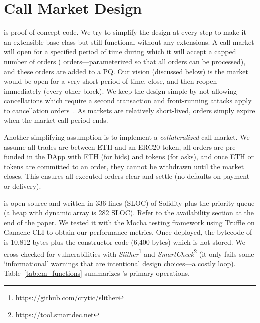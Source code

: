 
\section{Call Market Design}



\cm is proof of concept code. We try to simplify the design at every step to make it an extensible base class but still functional without any extensions. A call market will open for a specified period of time during which it will accept a capped number of orders ( orders---parameterized so that all orders can be processed), and these orders are added to a PQ. Our vision (discussed below) is the market would be open for a very short period of time, close, and then reopen immediately (\eg every other block). We keep the design simple by not allowing cancellations which require a second transaction and front-running attacks apply to cancellation orders~\cite{eskandari2019sok}. As markets are relatively short-lived, orders simply expire when the market call period ends.

Another simplifying assumption is to implement a \textit{collateralized} call market. We assume all trades are between ETH and an ERC20 token, all orders are pre-funded in the DApp with ETH (for bids) and tokens (for asks), and once ETH or tokens are committed to an order, they cannot be withdrawn until the market closes. This ensures all executed orders clear and settle (\ie no defaults on payment or delivery).


\cm is open source and written in 336 lines (SLOC) of Solidity plus the priority queue (\eg a heap with dynamic array is 282 SLOC). Refer to the availability section at the end of the paper. We tested it with the Mocha testing framework using Truffle on Ganache-CLI to obtain our performance metrics. Once deployed, the bytecode of \cm is 10,812 bytes plus the constructor code (6,400 bytes) which is not stored. We cross-checked for vulnerabilities with \textit{Slither}\footnote{https://github.com/crytic/slither} and \textit{SmartCheck}\footnote{https://tool.smartdec.net} (it only fails some `informational' warnings that are intentional design choices---\eg a costly loop). Table~\ref{tab:cm_functions} summarizes \cm's primary operations.


